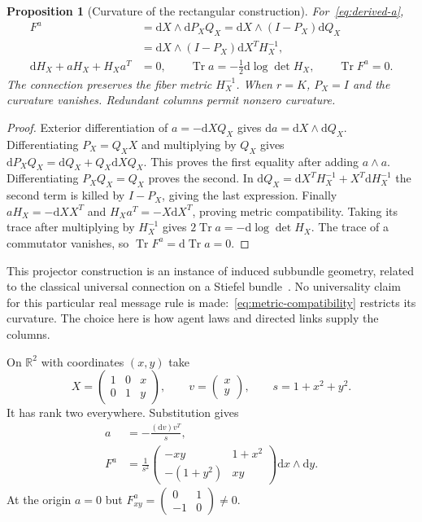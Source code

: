 \documentclass[11pt]{article}
\newtheorem{proposition}[theorem]{Proposition}
\newcommand{\R}{\mathbb R}
\newcommand{\Tr}{\operatorname{Tr}}
\newcommand{\dd}{\mathrm d}
\begin{document}
\begin{proposition}[Curvature of the rectangular construction]
For~\eqref{eq:derived-a},
\begin{align}
 F^a&=\dd X\wedge\dd P_X Q_X
      =\dd X\wedge(I-P_X)\dd Q_X\nonumber\\
    &=\dd X\wedge(I-P_X)\dd X^T H_X^{-1},
 \label{eq:curvature}\\
 \dd H_X+aH_X+H_Xa^T&=0,\qquad
 \Tr a=-\tfrac12\dd\log\det H_X,\qquad \Tr F^a=0.
 \label{eq:metric-compatibility}
\end{align}
The connection preserves the fiber metric $H_X^{-1}$. When $r=K$, $P_X=I$ and the curvature vanishes. Redundant columns permit nonzero curvature.
\end{proposition}
\begin{proof}
Exterior differentiation of $a=-\dd XQ_X$ gives $\dd a=\dd X\wedge\dd Q_X$. Differentiating $P_X=Q_XX$ and multiplying by $Q_X$ gives $\dd P_XQ_X=\dd Q_X+Q_X\dd XQ_X$. This proves the first equality after adding $a\wedge a$. Differentiating $P_XQ_X=Q_X$ proves the second. In $\dd Q_X=\dd X^TH_X^{-1}+X^T\dd H_X^{-1}$ the second term is killed by $I-P_X$, giving the last expression. Finally $aH_X=-\dd XX^T$ and $H_Xa^T=-X\dd X^T$, proving metric compatibility. Taking its trace after multiplying by $H_X^{-1}$ gives $2\Tr a=-\dd\log\det H_X$. The trace of a commutator vanishes, so $\Tr F^a=\dd\Tr a=0$.
\end{proof}

This projector construction is an instance of induced subbundle geometry, related to the classical universal connection on a Stiefel bundle~\cite{Narasimhan1962,MassambaThompson2003}. No universality claim for this particular real message rule is made:~\eqref{eq:metric-compatibility} restricts its curvature. The choice here is how agent laws and directed links supply the columns.

On $\R^2$ with coordinates $(x,y)$ take
\begin{equation}
 X=\begin{pmatrix}1&0&x\\0&1&y\end{pmatrix},\qquad
 v=\begin{pmatrix}x\\y\end{pmatrix},\qquad s=1+x^2+y^2.
 \label{eq:witnessX}
\end{equation}
It has rank two everywhere. Substitution gives
\begin{align}
 a&=-\frac{(\dd v)v^T}{s},\label{eq:witnessA}\\
 F^a&=\frac{1}{s^2}
 \begin{pmatrix}-xy&1+x^2\\-(1+y^2)&xy\end{pmatrix}
 \dd x\wedge\dd y.
 \label{eq:witnessF}
\end{align}
At the origin $a=0$ but $F^a_{xy}=\begin{pmatrix}0&1\\-1&0\end{pmatrix}\ne0$.
\end{document}
